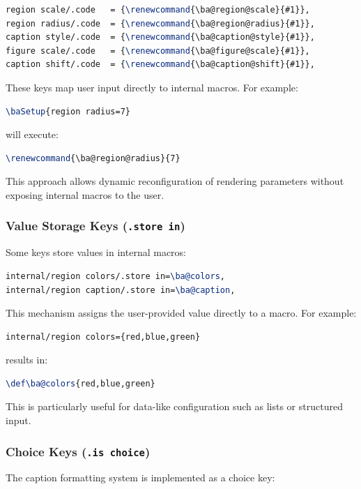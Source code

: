 \begin{lstlisting}[language=LaTeX]
region scale/.code   = {\renewcommand{\ba@region@scale}{#1}},
region radius/.code  = {\renewcommand{\ba@region@radius}{#1}},
caption style/.code  = {\renewcommand{\ba@caption@style}{#1}},
figure scale/.code   = {\renewcommand{\ba@figure@scale}{#1}},
caption shift/.code  = {\renewcommand{\ba@caption@shift}{#1}},
\end{lstlisting}
These keys map user input directly to internal macros. For example:

\begin{lstlisting}[language=LaTeX]
\baSetup{region radius=7}
\end{lstlisting}
will execute:
\begin{lstlisting}[language=LaTeX]
\renewcommand{\ba@region@radius}{7}
\end{lstlisting}
This approach allows dynamic reconfiguration of rendering parameters without exposing internal macros to the user.

\subsubsection{Value Storage Keys (\texttt{.store in})}

Some keys store values in internal macros:
\begin{lstlisting}[language=LaTeX]
internal/region colors/.store in=\ba@colors,
internal/region caption/.store in=\ba@caption,
\end{lstlisting}
This mechanism assigns the user-provided value directly to a macro. For example:
\begin{lstlisting}[language=LaTeX]
internal/region colors={red,blue,green}
\end{lstlisting}
results in:
\begin{lstlisting}[language=LaTeX]
\def\ba@colors{red,blue,green}
\end{lstlisting}
This is particularly useful for data-like configuration such as lists or structured input.

\subsubsection{Choice Keys (\texttt{.is choice})}

The caption formatting system is implemented as a choice key:

